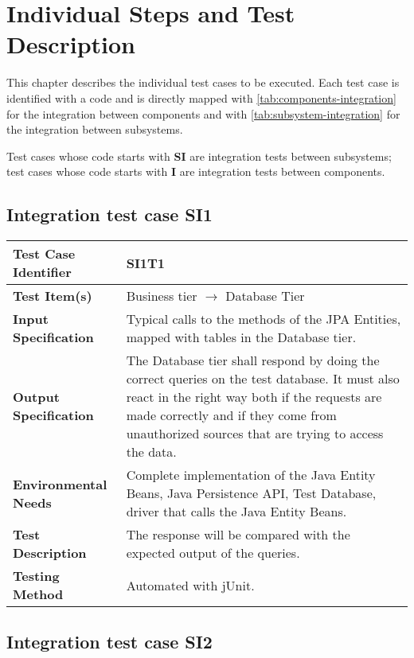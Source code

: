 \chapter{Individual Steps and Test Description}
\label{chap:individual-steps}

This chapter describes the individual test cases to be executed.
Each test case is identified with a code and is directly mapped with \autoref{tab:components-integration} for the integration between components and with \autoref{tab:subsystem-integration} for the integration between subsystems.

Test cases whose code starts with \textbf{SI} are integration tests between subsystems; test cases whose code starts with \textbf{I} are integration tests between components.

\section{Integration test case SI1}

\begin{tabular}{l p{}}
    \hline
    \textbf{Test Case Identifier} & SI1T1\\
    \hline
    \textbf{Test Item(s)} & Business tier $\rightarrow$ Database Tier\\
    \hline
    \textbf{Input Specification} & Typical calls to the methods of the JPA Entities, mapped with tables in the Database tier.\\
    \hline
    \textbf{Output Specification} & The Database tier shall respond by doing the correct queries on the test database. It must also react in the right way both if the requests are made correctly and if they come from unauthorized sources that are trying to access the data.\\
    \hline
    \textbf{Environmental Needs} & Complete implementation of the Java Entity Beans, Java Persistence API, Test Database, driver that calls the Java Entity Beans. \\
    \hline
    \textbf{Test Description} & The response will be compared with the expected output of the queries.\\
    \hline
    \textbf{Testing Method} & Automated with jUnit. \\
    \hline
\end{tabular}

\vspace{2em}

\section{Integration test case SI2}

